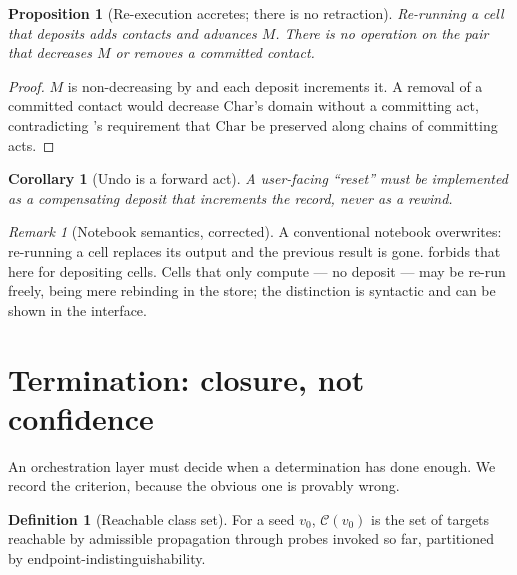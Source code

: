 \documentclass[twocolumn,11pt,a4paper]{article}
\theoremstyle{sup}
\newtheorem{proposition}[theorem]{Proposition}
\newtheorem{corollary}[theorem]{Corollary}
\theoremstyle{definition}
\newtheorem{definition}[theorem]{Definition}
\theoremstyle{remark}
\newtheorem{remark}[theorem]{Remark}
\newcommand{\rec}{M}
\newcommand{\Char}{\mathrm{Char}}
\newcommand{\Cell}{\mathcal{C}}
\begin{document}
\begin{proposition}[Re-execution accretes; there is no retraction]
\label{prop:no-retract}
Re-running a cell that deposits adds contacts and advances $\rec$. There is no
operation on the pair that decreases $\rec$ or removes a committed contact.
\end{proposition}

\begin{proof}
$\rec$ is non-decreasing by  and each deposit increments it. A
removal of a committed contact would decrease $\Char$'s domain without a
committing act, contradicting 's requirement that
$\Char$ be preserved along chains of committing acts.
\end{proof}

\begin{corollary}[Undo is a forward act]
\label{cor:undo}
A user-facing ``reset'' must be implemented as a compensating deposit that
\emph{increments} the record, never as a rewind.
\end{corollary}

\begin{remark}[Notebook semantics, corrected]
\label{rem:notebook}
A conventional notebook overwrites: re-running a cell replaces its output and
the previous result is gone.  forbids that here for
depositing cells. Cells that only compute --- no deposit --- may be re-run
freely, being mere rebinding in the store; the distinction is syntactic and can
be shown in the interface.
\end{remark}

\section{Termination: closure, not confidence}
\label{sec:term}

An orchestration layer must decide when a determination has done enough. We
record the criterion, because the obvious one is provably wrong.

\begin{definition}[Reachable class set]
\label{def:class-set-srg}
For a seed $v_0$, $\Cell(v_0)$ is the set of targets reachable by admissible
propagation through probes invoked so far, partitioned by
endpoint-indistinguishability.
\end{definition}
\end{document}
